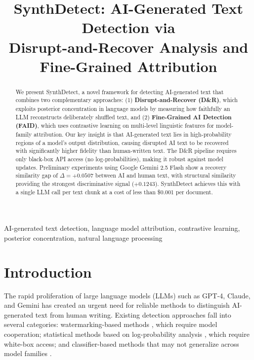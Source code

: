 \documentclass[conference]{IEEEtran}
\begin{document}
\title{SynthDetect: AI-Generated Text Detection via\\
Disrupt-and-Recover Analysis and Fine-Grained Attribution}

\author{
}

\maketitle

\begin{abstract}
We present SynthDetect, a novel framework for detecting AI-generated text
that combines two complementary approaches: (1) \textbf{Disrupt-and-Recover (D\&R)},
which exploits posterior concentration in language models by measuring how
faithfully an LLM reconstructs deliberately shuffled text, and
(2) \textbf{Fine-Grained AI Detection (FAID)}, which uses contrastive learning
on multi-level linguistic features for model-family attribution.
Our key insight is that AI-generated text lies in high-probability regions
of a model's output distribution, causing disrupted AI text to be recovered
with significantly higher fidelity than human-written text.
The D\&R pipeline requires only black-box API access (no log-probabilities),
making it robust against model updates.
Preliminary experiments using Google Gemini 2.5 Flash show a recovery
similarity gap of $\Delta = +0.0507$ between AI and human text,
with structural similarity providing the strongest discriminative signal
($+0.1243$). SynthDetect achieves this with a single LLM call per text
chunk at a cost of less than \$0.001 per document.
\end{abstract}

\begin{IEEEkeywords}
AI-generated text detection, language model attribution, contrastive learning,
posterior concentration, natural language processing
\end{IEEEkeywords}

\section{Introduction}

The rapid proliferation of large language models (LLMs) such as GPT-4,
Claude, and Gemini has created an urgent need for reliable methods to
distinguish AI-generated text from human writing. Existing detection
approaches fall into several categories: watermarking-based methods
\cite{kirchenbauer2023}, which require model cooperation; statistical
methods based on log-probability analysis \cite{mitchell2023}, which
require white-box access; and classifier-based methods that may not
generalize across model families \cite{guo2023}.
\end{document}
